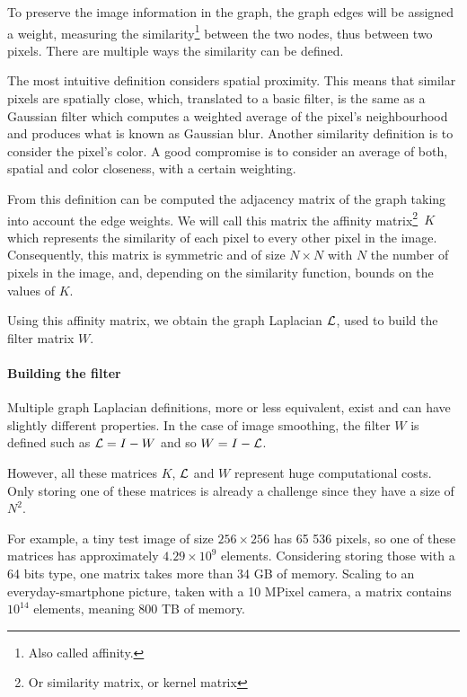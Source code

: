 To preserve the image information in the graph, the graph edges will be assigned a weight, measuring the similarity\footnote{Also called affinity.} between the two nodes, thus between two pixels.
There are multiple ways the similarity can be defined.

The most intuitive definition considers spatial proximity.
This means that similar pixels are spatially close, which, translated to a basic filter, is the same as a Gaussian filter which computes a weighted average of the pixel's neighbourhood and produces what is known as Gaussian blur.
Another similarity definition is to consider the pixel's color.
A good compromise is to consider an average of both, spatial and color closeness, with a certain weighting.

From this definition can be computed the adjacency matrix of the graph taking into account the edge weights.
We will call this matrix the affinity matrix\footnote{Or similarity matrix, or kernel matrix}\ \(K\) which represents the similarity of each pixel to every other pixel in the image.
Consequently, this matrix is symmetric and of size \(N \times N\) with \(N\) the number of pixels in the image, and, depending on the similarity function, bounds on the values of \(K\).

Using this affinity matrix, we obtain the graph Laplacian \(\operatorname{\mathcal{L}}\), used to build the filter matrix \(W\).

\paragraph{Building the filter}

Multiple graph Laplacian definitions, more or less equivalent, exist and can have slightly different properties.
In the case of image smoothing, the filter \(W\) is defined such as \(\operatorname{\mathcal{L}} = I - W\) \cite{siam_slides_2016} and so \(W = I - \operatorname{\mathcal{L}}\).

However, all these matrices \(K\), \(\operatorname{\mathcal{L}}\) and \(W\) represent huge computational costs.
Only storing one of these matrices is already a challenge since they have a size of \(N^2\).

For example, a tiny test image of size \(256 \times 256\) has 65 536 pixels, so one of these matrices has approximately \(4.29 \times 10^9\) elements.
Considering storing those with a 64 bits type, one matrix takes more than 34 GB of memory.
Scaling to an everyday-smartphone picture, taken with a 10 MPixel camera, a matrix contains \(10^{14}\) elements, meaning 800 TB of memory.

